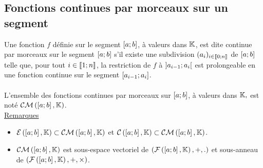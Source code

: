\subsection{Fonctions continues par morceaux sur un segment}
\begin{defi}
    Une fonction \(f\) définie sur le segment \(\left[a;b\right]\), à valeurs dans \(\mathbb{K}\), est dite continue par morceaux sur le segment \(\left[a;b\right]\) s’il existe une subdivision \((a_i)_{i\in \left\llbracket0;n\right\rrbracket}\) de \(\left[a;b\right]\) telle que, pour tout \(i \in  \left\llbracket1;n\right\rrbracket\), la restriction de \(f\) à \(\left]a_{i-1};a_i\right[\) est prolongeable en une fonction continue sur le segment \(\left[a_{i-1};a_i\right]\).\\~\\
    L’ensemble des fonctions continues par morceaux sur \(\left[a;b\right]\), à valeurs dans \(\mathbb{K},\) est noté \(\mathcal{CM}\left(\left[a;b\right] , \mathbb{K}\right)\).\\
    \underline{Remarques}\\
    \begin{itemize}
        \item \(\mathcal{E}  \left(\left[a;b\right] , \mathbb{K}\right) \subset \mathcal{CM} \left(\left[a;b\right] , \mathbb{K}\right)\) et \(\mathcal{C} \left(\left[a;b\right] , \mathbb{K}\right) \subset \mathcal{CM} \left(\left[a;b\right] , \mathbb{K}\right)\).
        \item \(\mathcal{CM} \left(\left[a;b\right] , \mathbb{K}\right)\) est sous-espace vectoriel de \(\left(\mathcal{F} \left(\left[a;b\right] , \mathbb{K}\right) , +, .\right)\) et sous-anneau de \(\left(\mathcal{F} \left(\left[a;b\right] , \mathbb{K}\right) , +, \times \right)\).
    \end{itemize}
\end{defi}
